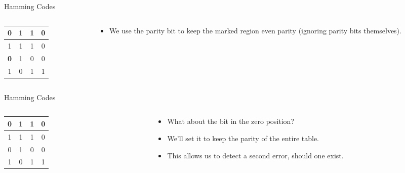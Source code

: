 \documentclass[aspectratio=169, handout]{beamer}
\makeatletter
\newcommand{\blu}[1]{{\color{sigma@mainblue}#1}}
\makeatother
\begin{document}
\begin{frame}{Hamming Codes}
    \begin{columns}[c]
    \begin{column}{5cm}
    \begin{table}
        \centering
        \begin{tabular}{|c|c|c|c|}
            \hline 
            0 & 1 & 1 & 0 \\ \hline
            1 & 1 & 1 & 0 \\ \hline
            \rowcolor{LightRed}
            \blu{\textbf{0}} & 1 & 0 & 0 \\ \hline
            \rowcolor{LightRed}
            1 & 0 & 1 & 1 \\ \hline
        \end{tabular}
    \end{table}
    \end{column}
    \hfill
    \begin{column}{5cm}
        \begin{itemize}
            \item We use the parity bit to keep the marked region even parity (ignoring parity bits themselves).
        \end{itemize}
    \end{column}
    \end{columns}
\end{frame}

\begin{frame}{Hamming Codes}
    \begin{columns}[c]
    \begin{column}{5cm}
    \begin{table}
        \centering
        \begin{tabular}{|c|c|c|c|}
            \hline 
            \blu{\textbf{0}} & 1 & 1 & 0 \\ \hline
            1 & 1 & 1 & 0 \\ \hline
            0 & 1 & 0 & 0 \\ \hline
            1 & 0 & 1 & 1 \\ \hline
        \end{tabular}
    \end{table}
    \end{column}
    \hfill
    \begin{column}{5cm}
        \begin{itemize}
            \item What about the bit in the zero position? \pause
            \item We'll set it to keep the parity of the entire table. \pause
            \item This allows us to detect a second error, should one exist.
        \end{itemize}
    \end{column}
    \end{columns}
\end{frame}
\end{document}
